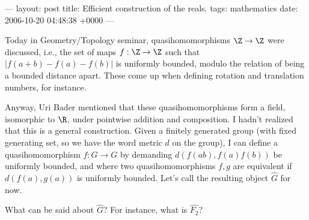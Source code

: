 ---
layout: post
title: Efficient construction of the reals.
tags: mathematics
date: 2006-10-20 04:48:38 +0000
---

Today in Geometry/Topology seminar, quasihomomorphisms $\Z \to \Z$ were discussed, i.e., the set of maps $f : \Z \to \Z$ such that $| f(a+b) - f(a) - f(b) |$ is uniformly bounded, modulo the relation of being a bounded distance apart.  These come up when defining rotation and translation numbers, for instance.

Anyway, Uri Bader mentioned that these quasihomomorphisms form a field, isomorphic to $\R$, under pointwise addition and composition.  I hadn't realized that this is a general construction.  Given a finitely generated group (with fixed generating set, so we have the word metric $d$ on the group), I can define a quasihomomorphism $f : G \to G$ by demanding $d(f(ab),f(a)f(b))$ be uniformly bounded, and where two quasihomomorphisms $f, g$ are equivalent if $d(f(a),g(a))$ is uniformly bounded.  Let's call the resulting object $\hat{G}$ for now.

What can be said about $\hat{G}$?  For instance, what is $\hat{F_2}$?

